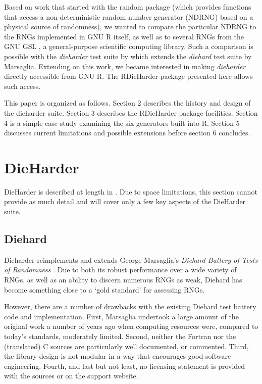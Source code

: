 \documentclass[12pt]{article}
\newcommand{\pkg}[1]{{\normalfont\fontseries{b}\selectfont #1}}
\begin{document}
Based on work that started with the \pkg{random} package
\citep{Eddelbuettel:random:2007} (which provides functions that access a
non-deterministic random number generator (NDRNG) based on a physical source
of randomness), we wanted to compare the particular NDRNG to the RNGs
implemented in GNU R \citep{RCore:R:2007} itself, as well as to several RNGs
from the GNU GSL \citep{gsl:2007}, a general-purpose scientific computing
library.  Such a comparison is possible with the \textsl{dieharder} test
suite by \cite{Brown:dieharder:2007} which extends the \textsl{diehard} test
suite by Marsaglia.  Extending on this work, we became interested in making
\textsl{dieharder} directly accessible from GNU R. The \pkg{RDieHarder}
package presented here allows such access.

This paper is organized as follows. Section 2 describes the history and
design of the dieharder suite.  Section 3 describes the \pkg{RDieHarder}
package facilities. Section 4 is a simple case study examining the six
generators built into R.  Section 5 discusses current limitations and
possible extensions before section 6 concludes.


\section{DieHarder}

DieHarder is described at length in \cite{Brown:dieharderpaper:2006}.  Due
to space limitations, this section cannot provide as much detail and will
cover only a few key aspects of the DieHarder suite.

\subsection{Diehard}
Dieharder reimplements and extends George Marsaglia's \textsl{Diehard Battery
  of Tests of Randomness} \citep{Marsaglia:1996}. Due to both its robust
performance over a wide variety of RNGs, as well as an ability to discern
numerous RNGs as weak, Diehard has become something close to a `gold standard'
for assessing RNGs.

However, there are a number of drawbacks with the existing Diehard test
battery code and implementation.  First, Marsaglia undertook a large
amount of the original work a number of years ago when computing resources
were, compared to today's standards, moderately limited. Second, neither the
Fortran nor the (translated) C sources are particularly well documented, or
commented. Third, the library design is not modular in a way that
encourages good software engineering. Fourth, and last but not least, no
licensing statement is provided with the sources or on the support website.
\end{document}
